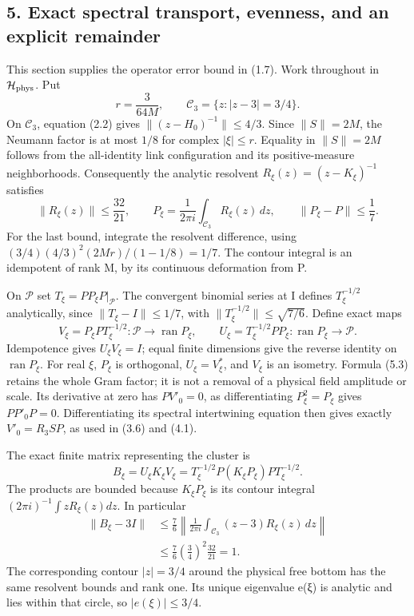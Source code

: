 \documentclass[
  11pt,
]{article}
\begin{document}
\subsection{5. Exact spectral transport, evenness, and an explicit
remainder}\label{magnetic-part-5-exact-spectral-transport-evenness-and-an-explicit-remainder}

This section supplies the operator error bound in (1.7). Work throughout
in \(\mathcal H_{\rm phys}\). Put \[
 r=\frac{3}{64M},\qquad \mathcal C_3=\{z:|z-3|=3/4\}.
\tag{5.1}
\] On \(\mathcal C_3\), equation (2.2) gives
\(\|(z-H_0)^{-1}\|\leq4/3\). Since \(\|S\|=2M\), the Neumann factor is
at most \(1/8\) for complex \(|\xi|\leq r\). Equality in \(\|S\|=2M\)
follows from the all-identity link configuration and its
positive-measure neighborhoods. Consequently the analytic resolvent
\(R_\xi(z)=(z-K_\xi)^{-1}\) satisfies \[
 \|R_\xi(z)\|\leq\frac{32}{21},\qquad
 P_\xi=\frac1{2\pi i}\int_{\mathcal C_3}R_\xi(z)\,dz,
 \qquad \|P_\xi-P\|\leq\frac17.
\tag{5.2}
\] For the last bound, integrate the resolvent difference, using
\((3/4)(4/3)^2(2Mr)/(1-1/8)=1/7\). The contour integral is an idempotent
of rank M, by its continuous deformation from P.

On \(\mathcal P\) set \(T_\xi=PP_\xi P|_{\mathcal P}\). The convergent
binomial series at I defines \(T_\xi^{-1/2}\) analytically, since
\(\|T_\xi-I\|\leq1/7\), with \(\|T_\xi^{-1/2}\|\leq\sqrt{7/6}\). Define
exact maps \[
 V_\xi=P_\xi P T_\xi^{-1/2}:\mathcal P\longrightarrow
                    \operatorname{ran}P_\xi,\qquad
 U_\xi=T_\xi^{-1/2}PP_\xi:\operatorname{ran}P_\xi\longrightarrow
                    \mathcal P.
\tag{5.3}
\] Idempotence gives \(U_\xi V_\xi=I\); equal finite dimensions give the
reverse identity on \(\operatorname{ran}P_\xi\). For real \(\xi\),
\(P_\xi\) is orthogonal, \(U_\xi=V_\xi^*\), and \(V_\xi\) is an
isometry. Formula (5.3) retains the whole Gram factor; it is not a
removal of a physical field amplitude or scale. Its derivative at zero
has \(PV'_0=0\), as differentiating \(P_\xi^2=P_\xi\) gives
\(PP'_0P=0\). Differentiating its spectral intertwining equation then
gives exactly \(V'_0=R_3SP\), as used in (3.6) and (4.1).

The exact finite matrix representing the cluster is \[
 B_\xi=U_\xi K_\xi V_\xi
      =T_\xi^{-1/2}P(K_\xi P_\xi)P T_\xi^{-1/2}.
\tag{5.4}
\] The products are bounded because \(K_\xi P_\xi\) is its contour
integral \((2\pi i)^{-1}\int zR_\xi(z)dz\). In particular \[
 \begin{split}
 \|B_\xi-3I\|
 &\leq\frac76\left\|\frac1{2\pi i}
       \int_{\mathcal C_3}(z-3)R_\xi(z)\,dz\right\|\\
 &\leq\frac76\left(\frac34\right)^2\frac{32}{21}=1.
 \end{split}
\tag{5.5}
\] The corresponding contour \(|z|=3/4\) around the physical free bottom
has the same resolvent bounds and rank one. Its unique eigenvalue e(ξ)
is analytic and lies within that circle, so \(|e(\xi)|\leq3/4\).
\end{document}
